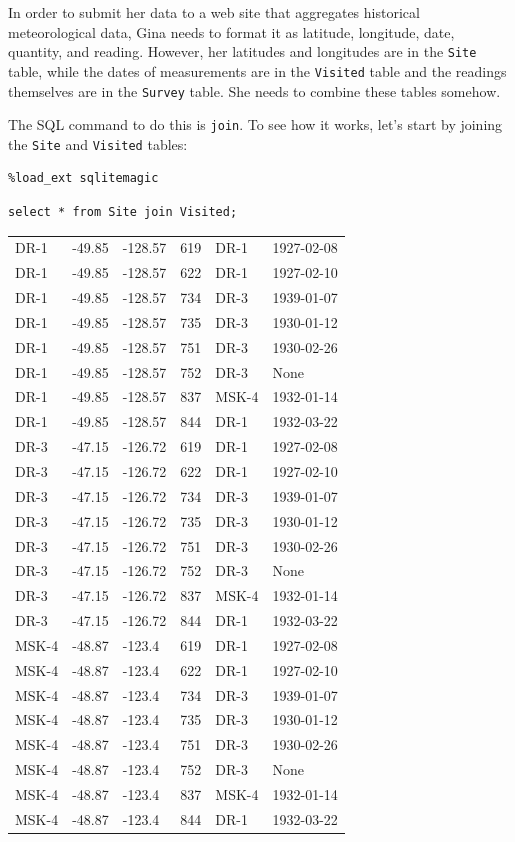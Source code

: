 \documentclass{book}
\begin{document}
In order to submit her data to a web site that aggregates historical
meteorological data, Gina needs to format it as latitude, longitude,
date, quantity, and reading. However, her latitudes and longitudes are
in the \texttt{Site} table, while the dates of measurements are in the
\texttt{Visited} table and the readings themselves are in the
\texttt{Survey} table. She needs to combine these tables somehow.

The SQL command to do this is \texttt{join}. To see how it works, let's
start by joining the \texttt{Site} and \texttt{Visited} tables:

\begin{verbatim}
%load_ext sqlitemagic
\end{verbatim}

\begin{verbatim}
select * from Site join Visited;
\end{verbatim}

\begin{tabular}{llllll}
DR-1 & -49.85 & -128.57 & 619 & DR-1 & 1927-02-08 \\
DR-1 & -49.85 & -128.57 & 622 & DR-1 & 1927-02-10 \\
DR-1 & -49.85 & -128.57 & 734 & DR-3 & 1939-01-07 \\
DR-1 & -49.85 & -128.57 & 735 & DR-3 & 1930-01-12 \\
DR-1 & -49.85 & -128.57 & 751 & DR-3 & 1930-02-26 \\
DR-1 & -49.85 & -128.57 & 752 & DR-3 & None \\
DR-1 & -49.85 & -128.57 & 837 & MSK-4 & 1932-01-14 \\
DR-1 & -49.85 & -128.57 & 844 & DR-1 & 1932-03-22 \\
DR-3 & -47.15 & -126.72 & 619 & DR-1 & 1927-02-08 \\
DR-3 & -47.15 & -126.72 & 622 & DR-1 & 1927-02-10 \\
DR-3 & -47.15 & -126.72 & 734 & DR-3 & 1939-01-07 \\
DR-3 & -47.15 & -126.72 & 735 & DR-3 & 1930-01-12 \\
DR-3 & -47.15 & -126.72 & 751 & DR-3 & 1930-02-26 \\
DR-3 & -47.15 & -126.72 & 752 & DR-3 & None \\
DR-3 & -47.15 & -126.72 & 837 & MSK-4 & 1932-01-14 \\
DR-3 & -47.15 & -126.72 & 844 & DR-1 & 1932-03-22 \\
MSK-4 & -48.87 & -123.4 & 619 & DR-1 & 1927-02-08 \\
MSK-4 & -48.87 & -123.4 & 622 & DR-1 & 1927-02-10 \\
MSK-4 & -48.87 & -123.4 & 734 & DR-3 & 1939-01-07 \\
MSK-4 & -48.87 & -123.4 & 735 & DR-3 & 1930-01-12 \\
MSK-4 & -48.87 & -123.4 & 751 & DR-3 & 1930-02-26 \\
MSK-4 & -48.87 & -123.4 & 752 & DR-3 & None \\
MSK-4 & -48.87 & -123.4 & 837 & MSK-4 & 1932-01-14 \\
MSK-4 & -48.87 & -123.4 & 844 & DR-1 & 1932-03-22 \\
\end{tabular}
\end{document}
